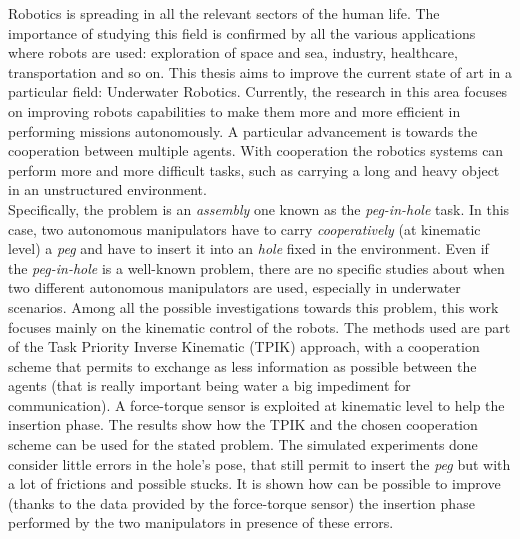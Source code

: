 


\begin{abstracts}

Robotics is spreading in all the relevant sectors of the human life. The importance of studying this field is confirmed by all the various applications where robots are used: exploration of space and sea, industry, healthcare, transportation and so on. This thesis aims to improve the current state of art in a particular field: Underwater Robotics. Currently, the research in this area focuses on improving robots capabilities to make them more and more efficient in performing missions autonomously. A particular advancement is towards the cooperation between multiple agents. With cooperation the robotics systems can perform more and more difficult tasks, such as carrying a long and heavy object in an unstructured environment.\\
Specifically, the problem is an \textit{assembly} one known as the \mbox{\textit{peg-in-hole}} task. In this case, two autonomous manipulators have to carry \textit{cooperatively} (at kinematic level) a \textit{peg} and have to insert it into an \textit{hole} fixed in the environment. Even if the \textit{peg-in-hole} is a well-known problem, there are no specific studies about when two different autonomous manipulators are used, especially in underwater scenarios. Among all the possible investigations towards this problem, this work focuses mainly on the kinematic control of the robots. The methods used are part of the Task Priority Inverse Kinematic (TPIK) approach, with a cooperation scheme that permits to exchange as less information as possible between the agents (that is really important being water a big impediment for communication). A force-torque sensor is exploited at kinematic level to help the insertion phase. The results show how the TPIK and the chosen cooperation scheme can be used for the stated problem. The simulated experiments done consider little errors in the hole's pose, that still permit to insert the \textit{peg} but with a lot of frictions and possible stucks. It is shown how can be possible to improve (thanks to the data provided by the force-torque sensor) the insertion phase performed by the two manipulators in presence of these errors.\\

\end{abstracts}
